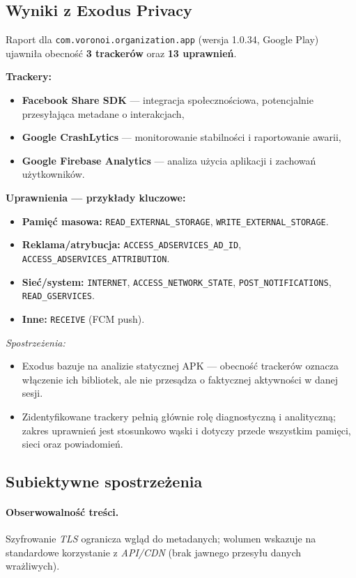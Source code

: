 \subsection{Wyniki z Exodus Privacy \cite{ExodusPrivacy}}
Raport dla \texttt{com.voronoi.organization.app} (wersja 1.0.34, Google Play) ujawniła obecność \textbf{3 trackerów} oraz \textbf{13 uprawnień}.

\textbf{Trackery:}
\begin{itemize}
  \item \textbf{Facebook Share SDK} — integracja społecznościowa, potencjalnie przesyłająca metadane o interakcjach,
  \item \textbf{Google CrashLytics} — monitorowanie stabilności i raportowanie awarii,
  \item \textbf{Google Firebase Analytics} — analiza użycia aplikacji i zachowań użytkowników.
\end{itemize}

\textbf{Uprawnienia — przykłady kluczowe:}
\begin{itemize}
  \item \textbf{Pamięć masowa:} \texttt{READ\_EXTERNAL\_STORAGE}, \texttt{WRITE\_EXTERNAL\_STORAGE}.
  \item \textbf{Reklama/atrybucja:} \texttt{ACCESS\_ADSERVICES\_AD\_ID}, \texttt{ACCESS\_ADSERVICES\_ATTRIBUTION}.
  \item \textbf{Sieć/system:} \texttt{INTERNET}, \texttt{ACCESS\_NETWORK\_STATE}, \texttt{POST\_NOTIFICATIONS}, \texttt{READ\_GSERVICES}.
  \item \textbf{Inne:} \texttt{RECEIVE} (FCM push).
\end{itemize}

\emph{Spostrzeżenia:} 
\begin{itemize}
  \item Exodus bazuje na analizie statycznej APK — obecność trackerów oznacza włączenie ich bibliotek, ale nie przesądza o faktycznej aktywności w danej sesji.
  \item Zidentyfikowane trackery pełnią głównie rolę diagnostyczną i analityczną; zakres uprawnień jest stosunkowo wąski i dotyczy przede wszystkim pamięci, sieci oraz powiadomień.
\end{itemize}

\subsection{Subiektywne spostrzeżenia}
\paragraph{Obserwowalność treści.} 
Szyfrowanie \emph{TLS} ogranicza wgląd do metadanych; wolumen wskazuje na standardowe korzystanie z \emph{API/CDN} (brak jawnego przesyłu danych wrażliwych).

